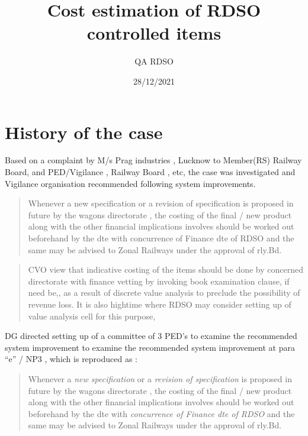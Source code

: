 \documentclass[
  10pt,
  twoside]{article}
\title{Cost estimation of RDSO controlled items}
\author{QA RDSO}
\date{28/12/2021}
\begin{document}
\maketitle

{
\setcounter{tocdepth}{2}
\tableofcontents
}
\tableofcontents

\hypertarget{history-of-the-case}{%
\section{History of the case}\label{history-of-the-case}}

Based on a complaint by M/s Prag industries , Lucknow to Member(RS)
Railway Board, and PED/Vigilance , Railway Board , etc, the case was
investigated and Vigilance organisation recommended following system
improvements.

\begin{quote}
Whenever a new specification or a revision of specification is proposed
in future by the wagons directorate , the costing of the final / new
product along with the other financial implications involves should be
worked out beforehand by the dte with concurrence of Finance dte of RDSO
and the same may be advised to Zonal Railways under the approval of
rly.Bd.
\end{quote}

\begin{quote}
CVO view that indicative costing of the items should be done by
concerned directorate with finance vetting by invoking book examination
clause, if need be,, as a result of discrete value analysis to preclude
the possibility of revenue loss. It is also hightime where RDSO may
consider setting up of value analysis cell for this purpose,
\end{quote}

DG directed setting up of a committee of 3 PED's to examine the
recommended system improvement to examine the recommended system
improvement at para ``e'' / NP3 , which is reproduced as :

\begin{quote}
Whenever a \emph{new specification} or a \emph{revision of
specification} is proposed in future by the wagons directorate , the
costing of the final / new product along with the other financial
implications involves should be worked out beforehand by the dte with
\emph{concurrence of Finance dte of RDSO} and the same may be advised to
Zonal Railways under the approval of rly.Bd.
\end{quote}
\end{document}
